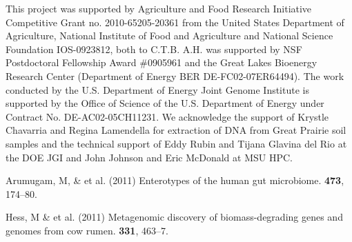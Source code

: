 \documentclass{pnastwo}
\begin{document}
\begin{article}
\begin{acknowledgments} This project was supported by Agriculture and Food
Research Initiative Competitive Grant no. 2010-65205-20361 from the United
States Department of Agriculture, National Institute of Food and Agriculture and
National Science Foundation IOS-0923812, both to C.T.B. A.H. was supported by
NSF Postdoctoral Fellowship Award \#0905961 and the Great Lakes Bioenergy
Research Center (Department of Energy BER DE-FC02-07ER64494). The work conducted
by the U.S. Department of Energy Joint Genome Institute is supported by the
Office of Science of the U.S. Department of Energy under Contract No.
DE-AC02-05CH11231. We acknowledge the support of Krystle Chavarria and Regina
Lamendella for extraction of DNA from Great Prairie soil samples and the
technical support of Eddy Rubin and Tijana Glavina del Rio at the DOE JGI and
John Johnson and Eric McDonald at MSU HPC. \end{acknowledgments}


\begin{thebibliography}{10}

 Arumugam, M, \& et al. \newblock (2011) Enterotypes of
the human gut microbiome.  {\bf 473}, 174--80.


 Hess, M \& et al. \newblock
(2011) Metagenomic discovery of biomass-degrading genes and genomes from cow
rumen.  {\bf 331}, 463--7.


\end{thebibliography}
\end{article}
\end{document}
